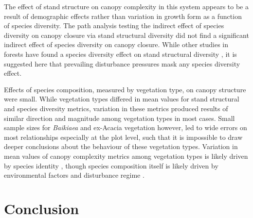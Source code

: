 \documentclass[11pt,a4paper]{article}
\begin{document}
The effect of stand structure on canopy complexity in this system appears to be a result of demographic effects rather than variation in growth form as a function of species diversity. The path analysis testing the indirect effect of species diversity on canopy closure via stand structural diversity did not find a significant indirect effect of species diversity on canopy closure. While other studies in forests have found a species diversity effect on stand structural diversity \citep{}, it is suggested here that prevailing disturbance pressures mask any species diversity effect.

Effects of species composition, measured by vegetation type, on canopy structure were small. While vegetation types differed in mean values for stand structural and species diversity metrics, variation in these metrics produced results of similar direction and magnitude among vegetation types in most cases. Small sample sizes for \textit{Baikiaea} and ex-Acacia vegetation however, led to wide errors on most relationships especially at the plot level, such that it is impossible to draw deeper conclusions about the behaviour of these vegetation types. Variation in mean values of canopy complexity metrics among vegetation types is likely driven by species identity \citep{}, though species composition itself is likely driven by environmental factors and disturbance regime \citep{}. 


\section{Conclusion}

\printbibliography



\end{document}
